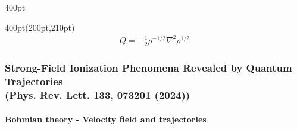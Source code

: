 \begin{frame}
\begin{textblock*}{400pt}
\begin{itemize}
\end{itemize}
\end{textblock*}


\begin{textblock*}{400pt}(200pt,210pt)
\begin{align}
Q = -\frac{1}{2} \rho^{-1/2} \nabla^2 \rho^{1/2}
\end{align}
\end{textblock*}



\end{frame}


\begin{frame}
\frametitle{Strong-Field Ionization Phenomena Revealed by Quantum Trajectories \\
\small (Phys. Rev. Lett. \textbf{133}, 073201 (2024))}
\framesubtitle{Bohmian theory - Velocity field and trajectories}


\footnotesize
 

\end{frame}
